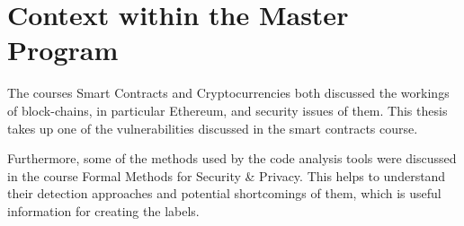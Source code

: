 \documentclass[paper=a4,fontsize=11pt,oneside,titlepage]{scrartcl}
\begin{document}
\iffalse
\begin{itemize}
\item What are the existing approaches addressing similar problems? (Include at least 4 references.)
\item What makes the thesis different? How does it go beyond the state of the art?
\end{itemize}
\fi

\section{Context within the Master Program}
\label{sec:masterProgram}

The courses Smart Contracts and Cryptocurrencies both discussed the workings of block\hyp{}chains, in particular Ethereum, and security issues of them. This thesis takes up one of the vulnerabilities discussed in the smart contracts course.

Furthermore, some of the methods used by the code analysis tools were discussed in the course Formal Methods for Security \& Privacy. This helps to understand their detection approaches and potential shortcomings of them, which is useful information for creating the labels.

\iffalse
\begin{itemize}
\item Where does the thesis fit in the Software Engineering \& Internet Computing
Master program? Which course materials are relevant?
\item Optional: Relevance to other Informatics Master programs at TU Wien
\end{itemize}
\fi

\newpage


\end{document}
